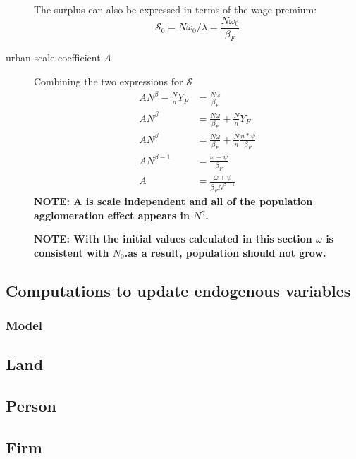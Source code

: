 \begin{description}
The surplus can also be expressed in terms of the wage premium:
\[\mathcal{S_0}=N\omega_0/\lambda=\frac{N\omega_0}{\beta_F}\] 


\item[urban scale coefficient $A$] Combining the two expressions for $\mathcal{S}$
\begin{align*}
 AN^\beta-\frac{N}{n}Y_F    &=\frac{N\omega}{\beta_F}\\ 
 AN^\beta   &=\frac{N\omega}{\beta_F} + \frac{N}{n}Y_F \\
 AN^\beta   &=\frac{N\omega}{\beta_F} + \frac{N}{n}\frac{n*\psi}{\beta_F}\\
AN^{\beta-1}   &=\frac{\omega+\psi}{\beta_F}\\ 
  A&=\frac{\omega+\psi}{\beta_FN^{\beta-1}}
\end{align*}
\textbf{NOTE: A is scale independent and all of the population agglomeration effect appears in $N^\gamma$.}

\textbf{NOTE: With the initial values calculated in this section $\omega$ is consistent with $N_0$.as a result, population should not grow. }


\end{description}

\subsection{Computations to update endogenous variables}

\subsubsection{Model}
\subsection{Land}
\subsection{Person}
\subsection{Firm}
